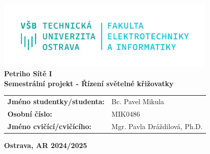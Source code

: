 \documentclass[a4paper,12pt]{report}
\newcommand{\studentName}{Bc. Pavel Mikula}
\newcommand{\studentID}  {MIK0486}
\newcommand{\teacherName}{Mgr. Pavla Dráždilová, Ph.D.}
\begin{document}
\thispagestyle{empty}
\setcounter{page}{0}

\begin{center}
    \includegraphics[width=0.8\textwidth]{assets/logo.png} \\[4em]
    \vspace{4em}
    \textbf{\huge{Petriho Sítě I}} \\
    \vspace{4em}
    \textbf{\large{Semestrální projekt - Řízení světelné křižovatky}} \\
\end{center}

\vspace{3em}
\hspace{2em}
\begin{tabular}{ll}
    \textbf{Jméno studentky/studenta:}  & \hspace{6em} \studentName \\[0.5em]
    \textbf{Osobní číslo:}              & \hspace{6em} \studentID   \\[0.5em]
    \textbf{Jméno cvičící/cvičícího:}   & \hspace{6em} \teacherName \\
\end{tabular}

\vspace{25em}
\begin{center}
    \textbf{Ostrava, AR 2024/2025}
\end{center}

\newpage




\newpage

\end{document}
